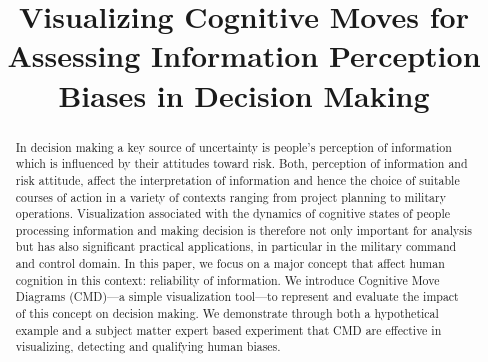 \documentclass[conference]{IEEEtran}
\begin{document}
\title{Visualizing Cognitive Moves for Assessing Information Perception Biases in Decision Making}


\author{









} \maketitle

\begin{abstract}
In decision making a key source of uncertainty is people's perception of information which is
influenced by their attitudes toward risk. Both, perception of information and risk attitude,
affect the interpretation of information and hence the choice of suitable courses of action in a
variety of contexts ranging from project planning to military operations. Visualization associated
with the dynamics of cognitive states of people processing information and making decision is
therefore not only important for analysis but has also significant practical applications, in
particular in the military command and control domain. In this paper, we focus on a major concept
that affect human cognition in this context: reliability of information. We introduce Cognitive
Move Diagrams (CMD)---a simple visualization tool---to represent and evaluate the impact of this
concept on decision making. We demonstrate through both a hypothetical example and a subject matter
expert based experiment that CMD are effective in visualizing, detecting and qualifying human
biases.
\end{abstract}

\IEEEpeerreviewmaketitle
\end{document}
